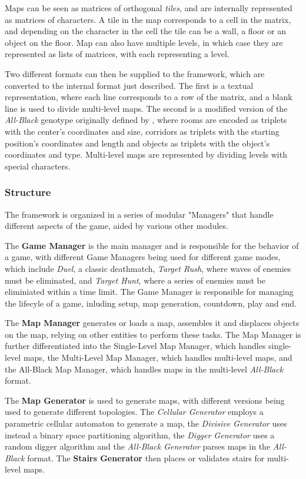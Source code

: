 \documentclass{Configuration_Files/PoliMi3i_thesis}
\begin{document}
Maps can be seen as matrices of orthogonal \textit{tiles}, and are internally represented as matrices of characters. A tile in the map corresponds to a cell in the matrix, and depending on the character in the cell the tile can be a wall, a floor or an object on the floor. Map can also have multiple levels, in which case they are represented as lists of matrices, with each representing a level.

Two different formats can then be supplied to the framework, which are converted to the internal format just described. The first is a textual representation, where each line corresponds to a row of the matrix, and a blank line is used to divide multi-level maps. The second is a modified version of the \textit{All-Black} genotype originally defined by \citeauthor{cardamone_evolving_2011}, where rooms are encoded as triplets with the center's coordinates and size, corridors as triplets with the starting position's coordinates and length and objects as triplets with the object's coordinates and type. Multi-level maps are represented by dividing levels with special characters.

\subsubsection{Structure}
\label{subsec:structure}
The framework is organized in a series of modular "Managers" that handle different aspects of the game, aided by various other modules.

The \textbf{Game Manager} is the main manager and is responsible for the behavior of a game, with different Game Managers being used for different game modes, which include \textit{Duel}, a classic deathmatch, \textit{Target Rush}, where waves of enemies must be eliminated, and \textit{Target Hunt}, where a series of enemies must be eliminiated within a time limit. The Game Manager is responsible for managing the lifecyle of a game, inluding setup, map generation, countdown, play and end.

The \textbf{Map Manager} generates or loads a map, assembles it and displaces objects on the map, relying on other entities to perform these tasks. The Map Manager is further differentiated into the Single-Level Map Manager, which handles single-level maps, the Multi-Level Map Manager, which handles multi-level maps, and the All-Black Map Manager, which handles maps in the multi-level \textit{All-Black} format.

The \textbf{Map Generator} is used to generate maps, with different versions being used to generate different topologies. The \textit{Cellular Generator} employs a parametric cellular automaton to generate a map, the \textit{Divisive Generator} uses instead a binary space partitioning algorithm, the \textit{Digger Generator} uses a random digger algorithm and the \textit{All-Black Generator} parses maps in the \textit{All-Black} format. The \textbf{Stairs Generator} then places or validates stairs for multi-level maps.
\end{document}
